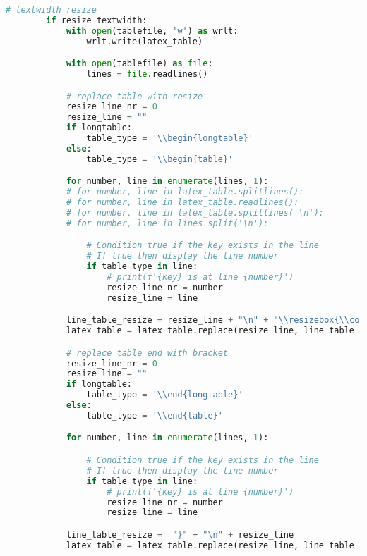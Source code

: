 \begin{lstlisting}[language=python, caption=pandas_dataframe_to_latex_table.py CSV - LaTex Tabelle,captionpos=b,label={lst:Python LaTex - pandas_dataframe_to_latex_table},breaklines=true]
        # textwidth resize
        if resize_textwidth:
            with open(tablefile, 'w') as wrlt:
                wrlt.write(latex_table)

            with open(tablefile) as file:
                lines = file.readlines()

            # replace table with resize
            resize_line_nr = 0
            resize_line = ""
            if longtable:
                table_type = '\\begin{longtable}'
            else:
                table_type = '\\begin{table}'

            for number, line in enumerate(lines, 1):
            # for number, line in latex_table.splitlines():
            # for number, line in latex_table.readlines():
            # for number, line in latex_table.splitlines('\n'):
            # for number, line in lines.split('\n'):

                # Condition true if the key exists in the line
                # If true then display the line number
                if table_type in line:
                    # print(f'{key} is at line {number}')
                    resize_line_nr = number
                    resize_line = line

            line_table_resize = resize_line + "\n" + "\\resizebox{\\columnwidth}{!}{%"
            latex_table = latex_table.replace(resize_line, line_table_resize)

            # replace table end with bracket
            resize_line_nr = 0
            resize_line = ""
            if longtable:
                table_type = '\\end{longtable}'
            else:
                table_type = '\\end{table}'

            for number, line in enumerate(lines, 1):

                # Condition true if the key exists in the line
                # If true then display the line number
                if table_type in line:
                    # print(f'{key} is at line {number}')
                    resize_line_nr = number
                    resize_line = line

            line_table_resize =  "}" + "\n" + resize_line
            latex_table = latex_table.replace(resize_line, line_table_resize)


\end{lstlisting}
